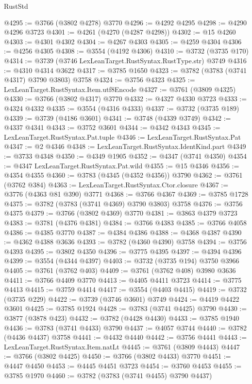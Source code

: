 \begin{lexlean}{RustStd}
\begin{coremodule}
@4295 := @3766 (@3802 @4278) @3770
@4296 := @4292 @4295
@4298 := @4290 @4296 @3723
@4301 := @4261 (@4270 (@4287 @4298))
@4302 := @15 @4260
@4303 := @4301 @4302
@4304 := @4267 @4303
@4305 := @4259 @4304
@4306 := @4256 @4305
@4308 := @3554 (@4192 @4306)
@4310 := @3732 (@3735 @170)
@4314 := @3739 (@3746 LexLeanTarget.RustSyntax.RustType.str) @3749
@4316 := @4310 @4314 @3622
@4317 := @3785 @1650
@4323 := @3782 (@3783 (@3741 @4317) @3790 @3803) @3758
@4324 := @3756 @4323
@4325 := LexLeanTarget.RustSyntax.Item.utf8Encode
@4327 := @3761 (@3809 @4325)
@4330 := @3766 (@3802 @4317) @3770
@4332 := @4327 @4330 @3723
@4333 := @4324 @4332
@4335 := @3554 (@4316 @4333)
@4337 := @3732 (@3735 @189)
@4339 := @3739 (@4186 @3601)
@4341 := @3748 (@4339 @3749)
@4342 := @4337 @4341
@4343 := @3752 @3601
@4344 := @4342 @4343
@4345 := LexLeanTarget.RustSyntax.Pat.tuple
@4346 := LexLeanTarget.RustSyntax.Pat
@4347 := @2 @4346
@4348 := LexLeanTarget.RustSyntax.IdentKind.part
@4349 := @3733 @4348
@4350 := @4349 @1905
@4352 := @4347 (@3741 @4350)
@4354 := @4347 LexLeanTarget.RustSyntax.Pat.wild
@4355 := @15 @4346
@4356 := @4354 @4355
@4360 := @3783 (@4345 (@4352 @4356)) @3790
@4362 := @3761 (@3762 @384)
@4363 := LexLeanTarget.RustSyntax.Ctor.closure
@4367 := @3776 (@4363 @81 @390) @3771
@4368 := @3766 @4367
@4369 := @3785 @1728
@4375 := @3782 (@3783 (@3741 @4369) @3790 @3803) @3758
@4376 := @3756 @4375
@4379 := @3766 (@3802 @4369) @3770
@4381 := @3863 @4379 @3723
@4383 := @3781 (@4376 @4381)
@4384 := @3766 @4383
@4385 := @3766 @4058
@4386 := @4385 @3770
@4387 := @4384 @4386
@4388 := @4368 @4387
@4390 := @4362 @4388 @3636
@4393 := @3782 (@4360 @4390) @3758
@4394 := @3756 @4393
@4395 := @3802 @4350
@4396 := @3775 @4395
@4397 := @4394 @4396
@4399 := @3554 (@4344 @4397)
@4403 := @3732 (@3735 @194) @3750 @3966
@4405 := @3761 (@3762 @403)
@4409 := @3761 (@3762 @408) @3980 @3636
@4411 := @3766 @4409 @3770
@4413 := @4405 @4411 @3723
@4414 := @3775 @4413
@4415 := @3759 @4414
@4417 := @3554 (@4403 @4415)
@4419 := @3732 (@3735 @229)
@4422 := @3739 (@3746 @3601) @3749
@4424 := @4419 @4422 @3601
@4425 := @3785 @1924
@4428 := @3783 (@3741 @4425) @3790
@4430 := @3877 (@3878 @423)
@4432 := @3782 (@4428 @4430)
@4433 := @3785 @1940
@4436 := @3783 (@3741 @4433) @3790
@4437 := @4057 @3744
@4440 := @3782 (@4436 @4437) @3758
@4441 := @4432 @4440
@4442 := @3756 @4441
@4443 := LexLeanTarget.RustSyntax.Item.natLt
@4445 := @3761 (@3809 @4443)
@4447 := @3766 (@3802 @4425)
@4450 := @3766 (@3802 @4433) @3770
@4451 := @4447 @4450
@4453 := @4445 @4451 @3723
@4454 := @3760 @4453
@4455 := @3785 @1970
@4460 := @3782 (@3783 (@3741 @4455) @3790 @4437)

\end{coremodule}
\end{lexlean}
